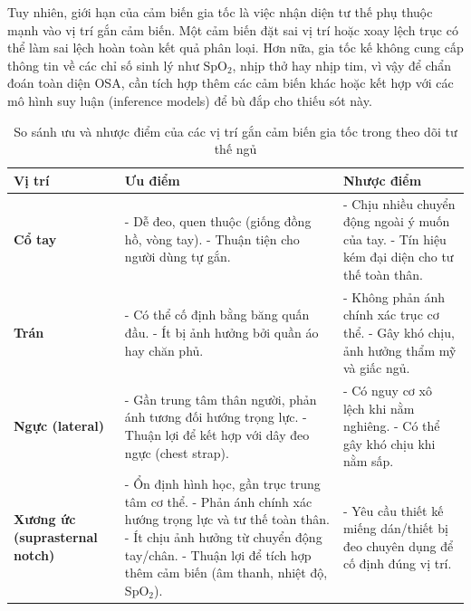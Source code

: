 Tuy nhiên, giới hạn của cảm biến gia tốc là việc nhận diện tư thế phụ thuộc
mạnh vào vị trí gắn cảm biến. Một cảm biến đặt sai vị trí hoặc xoay lệch trục
có thể làm sai lệch hoàn toàn kết quả phân loại. Hơn nữa, gia tốc kế không cung
cấp thông tin về các chỉ số sinh lý như $\mathrm{SpO_2}$, nhịp thở hay nhịp
tim, vì vậy để chẩn đoán toàn diện OSA, cần tích hợp thêm các cảm biến khác
hoặc kết hợp với các mô hình suy luận (inference models) để bù đắp cho thiếu
sót này.
\begin{table}[htbp]
  \centering
  \caption{So sánh ưu và nhược điểm của các vị trí gắn cảm biến gia tốc trong theo dõi tư thế ngủ}
  \label{tab:sensor_position}
  \small
  \renewcommand{\arraystretch}{1.3}
  \begin{tabular}{|p{3cm}|p{5.2cm}|p{6.2cm}|}
    \hline
    \textbf{Vị trí}                                                      & \textbf{Ưu điểm} & \textbf{Nhược điểm} \\
    \hline
    \textbf{Cổ tay}                                                      &
    - Dễ đeo, quen thuộc (giống đồng hồ, vòng tay).
    - Thuận tiện cho người dùng tự gắn.                                  &
    - Chịu nhiều chuyển động ngoài ý muốn của tay.
    - Tín hiệu kém đại diện cho tư thế toàn thân.                                                                 \\
    \hline
    \textbf{Trán}                                                        &
    - Có thể cố định bằng băng quấn đầu.
    - Ít bị ảnh hưởng bởi quần áo hay chăn phủ.                          &
    - Không phản ánh chính xác trục cơ thể.
    - Gây khó chịu, ảnh hưởng thẩm mỹ và giấc ngủ.                                                                \\
    \hline
    \textbf{Ngực (lateral)}                                              &
    - Gần trung tâm thân người, phản ánh tương đối hướng trọng lực.
    - Thuận lợi để kết hợp với dây đeo ngực (chest strap).               &
    - Có nguy cơ xô lệch khi nằm nghiêng.
    - Có thể gây khó chịu khi nằm sấp.                                                                            \\
    \hline
    \textbf{Xương ức (suprasternal notch)}                               &
    - Ổn định hình học, gần trục trung tâm cơ thể.
    - Phản ánh chính xác hướng trọng lực và tư thế toàn thân.
    - Ít chịu ảnh hưởng từ chuyển động tay/chân.
    - Thuận lợi để tích hợp thêm cảm biến (âm thanh, nhiệt độ, SpO$_2$). &
    - Yêu cầu thiết kế miếng dán/thiết bị đeo chuyên dụng để cố định đúng vị trí.                                 \\
    \hline
  \end{tabular}
\end{table}

